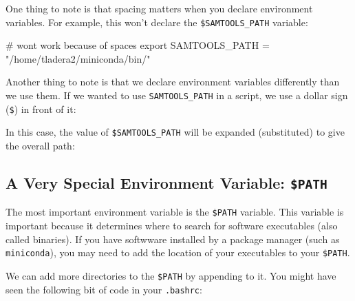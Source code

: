 \documentclass[
  letterpaper,
  DIV=11,
  numbers=noendperiod]{scrreprt}
\newenvironment{Shaded}{\begin{snugshade}}{\end{snugshade}}
\newcommand{\AttributeTok}[1]{\textcolor[rgb]{0.40,0.45,0.13}{#1}}
\newcommand{\BuiltInTok}[1]{\textcolor[rgb]{0.00,0.23,0.31}{#1}}
\newcommand{\CommentTok}[1]{\textcolor[rgb]{0.37,0.37,0.37}{#1}}
\newcommand{\ExtensionTok}[1]{\textcolor[rgb]{0.00,0.23,0.31}{#1}}
\newcommand{\NormalTok}[1]{\textcolor[rgb]{0.00,0.23,0.31}{#1}}
\newcommand{\OperatorTok}[1]{\textcolor[rgb]{0.37,0.37,0.37}{#1}}
\newcommand{\StringTok}[1]{\textcolor[rgb]{0.13,0.47,0.30}{#1}}
\newcommand{\VariableTok}[1]{\textcolor[rgb]{0.07,0.07,0.07}{#1}}
\begin{document}
One thing to note is that spacing matters when you declare environment
variables. For example, this won't declare the \texttt{\$SAMTOOLS\_PATH}
variable:

\begin{Shaded}
\begin{Highlighting}[]
\CommentTok{\# won\textquotesingle{}t work because of spaces}
\BuiltInTok{export} \VariableTok{SAMTOOLS\_PATH} \OperatorTok{=} \StringTok{"/home/tladera2/miniconda/bin/"}
\end{Highlighting}
\end{Shaded}

Another thing to note is that we declare environment variables
differently than we use them. If we wanted to use
\texttt{SAMTOOLS\_PATH} in a script, we use a dollar sign (\texttt{\$})
in front of it:

\begin{Shaded}
\end{Shaded}

In this case, the value of \texttt{\$SAMTOOLS\_PATH} will be expanded
(substituted) to give the overall path:

\begin{Shaded}
\end{Shaded}

\subsection{\texorpdfstring{A Very Special Environment Variable:
\texttt{\$PATH}}{A Very Special Environment Variable: \$PATH}}\label{sec-path}

The most important environment variable is the \texttt{\$PATH} variable.
This variable is important because it determines where to search for
software executables (also called binaries). If you have softwware
installed by a package manager (such as \texttt{miniconda}), you may
need to add the location of your executables to your \texttt{\$PATH}.

We can add more directories to the \texttt{\$PATH} by appending to it.
You might have seen the following bit of code in your \texttt{.bashrc}:
\end{document}

